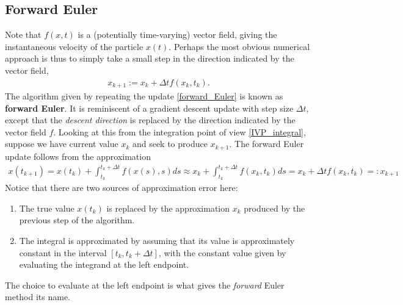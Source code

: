 \documentclass[12pt]{article}
\begin{document}
\subsection{Forward Euler}
Note that $f(x,t)$ is a (potentially time-varying) vector field, giving the instantaneous velocity of the particle $x(t)$. Perhaps the most obvious numerical 
approach is thus to simply take a small step in the direction indicated by the vector field,
\begin{align}
x_{k+1} := x_k + \Delta t f(x_k, t_k). \label{forward_Euler}
\end{align}
The algorithm given by repeating the update \ref{forward_Euler} is known as \textbf{forward Euler}. It is reminiscent of a gradient descent update with 
step size $\Delta t$, except that the \textit{descent direction} is replaced by the direction indicated by the vector field $f$. Looking at this from the 
integration point of view \ref{IVP_integral}, suppose we have current value $x_k$ and seek to produce $x_{k+1}$. The forward Euler update follows from 
the approximation 
\begin{align*}
x(t_{k+1}) = x(t_k) + \int_{t_k}^{t_k + \Delta t} f(x(s),s) ds \approx x_k + \int_{t_k}^{t_k + \Delta t} f(x_k,t_k) ds = x_k + \Delta t f(x_k, t_k) =: x_{k+1}
\end{align*}
Notice that there are two sources of approximation error here: 
\begin{enumerate}
\item The true value $x(t_k)$ is replaced by the approximation $x_k$ produced by the previous step of the algorithm. 
\item The integral is approximated by assuming that its value is approximately constant in the interval $[t_k, t_k + \Delta t]$, with the constant value given by 
evaluating the integrand at the left endpoint.
\end{enumerate}
The choice to evaluate at the left endpoint is what gives the \textit{forward} Euler method its name. 
\end{document}

